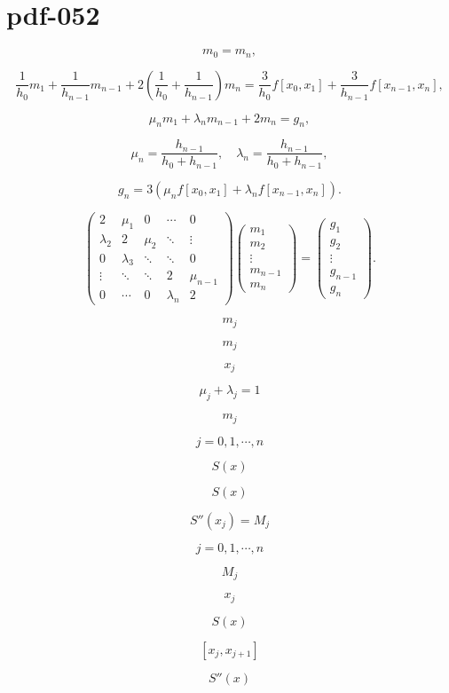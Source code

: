 \documentclass[fontset=fandol]{ctexart}
\begin{document}
\section*{pdf-052}

\[m_0=m_n,\]

\[\frac1{h_0}m_1+\frac1{h_{n-1}}m_{n-1}+2\left(\frac1{h_0}+\frac1{h_{n-1}}\right)m_n=\frac3{h_0}f[x_0,x_1]+\frac3{h_{n-1}}f[x_{n-1},x_n],\]

\[\mu_nm_1+\lambda_nm_{n-1}+2m_n=g_n,\]

\[\mu_n=\frac{h_{n-1}}{h_0+h_{n-1}},\quad\lambda_n=\frac{h_{n-1}}{h_0+h_{n-1}},\]

\[g_n=3(\mu_nf[x_0,x_1]+\lambda_nf[x_{n-1},x_n]).\]

\[\begin{pmatrix}
2&\mu_1&0&\cdots&0\\
\lambda_2&2&\mu_2&\ddots&\vdots\\
0&\lambda_3&\ddots&\ddots&0\\
\vdots&\ddots&\ddots&2&\mu_{n-1}\\
0&\cdots&0&\lambda_n&2
\end{pmatrix}
\begin{pmatrix}m_1\\m_2\\\vdots\\m_{n-1}\\m_n\end{pmatrix}
=\begin{pmatrix}g_1\\g_2\\\vdots\\g_{n-1}\\g_n\end{pmatrix}.\tag{2.8.15}\]

\[m_j\]

\[m_j\]

\[x_j\]

\[\mu_j+\lambda_j=1\]

\[m_j\]

\[j=0,1,\cdots,n\]

\[S(x)\]

\[S(x)\]

\[S''(x_j)=M_j\]

\[j=0,1,\cdots,n\]

\[M_j\]

\[x_j\]

\[S(x)\]

\[[x_j,x_{j+1}]\]

\[S''(x)\]
\end{document}
